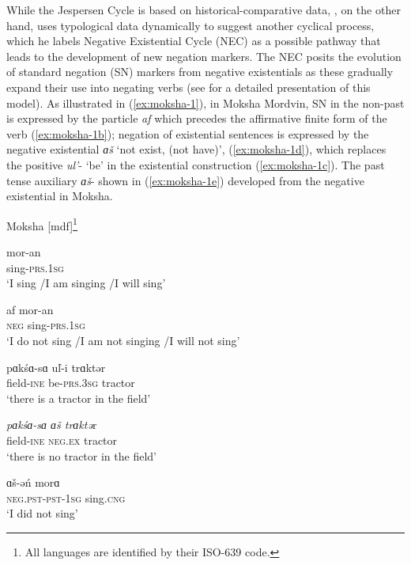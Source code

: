 \documentclass[output=paper,chinesefont,colorlinks,citecolor=brown]{langscibook}
\begin{document}
While the Jespersen Cycle is based on historical-comparative data, \citet{Croft1991}, on the other hand, uses typological data dynamically to suggest another cyclical process, which he labels Negative Existential Cycle (NEC) as a possible pathway that leads to the development of new negation markers. The NEC posits the evolution of standard negation (SN) markers from negative existentials as these gradually expand their use into negating verbs (see  for a detailed presentation of this model). As illustrated in (\ref{ex:moksha-1}), in Moksha Mordvin, SN in the non-past is expressed by the particle \textit{af} which precedes the affirmative finite form of the verb (\ref{ex:moksha-1b}); negation of existential sentences is expressed by the negative existential \textit{ɑš} ‘not exist, (not have)’, (\ref{ex:moksha-1d}), which replaces the positive \textit{ul’}- ‘be’ in the existential construction (\ref{ex:moksha-1c}).  The past tense auxiliary \textit{ɑš}- shown in (\ref{ex:moksha-1e}) developed from the negative existential in Moksha.

\begin{exe} \ex \label{ex:moksha-1} Moksha [mdf]\footnote{All languages are identified by their ISO-639 code.} 
  \begin{xlist}
\ex \label{ex:moksha-1a}
\gll mor-an\\
sing-\textsc{prs.1sg}\\
\glt ‘I sing {\slash}I am singing {\slash}I will sing’

\ex \label{ex:moksha-1b}
\gll af mor-an\\
\textsc{neg} sing-\textsc{prs.1sg}\\
\glt ‘I do not sing {\slash}I am not singing {\slash}I will not sing’

\ex \label{ex:moksha-1c}
\gll pɑkśɑ-sɑ uľ-i trɑktər\\
field-\textsc{ine} be-\textsc{prs.3sg}	tractor\\
\glt ‘there is a tractor in the field’

\ex \label{ex:moksha-1d}
\gll \textit{pɑkśɑ-sɑ ɑš trɑktǝ}r\\
field-\textsc{ine} \textsc{neg.ex} tractor\\
\glt ‘there is no tractor in the field’

\ex \label{ex:moksha-1e}
\gll ɑš-ǝń morɑ\\
\textsc{neg.pst}-\textsc{pst-1sg} sing.\textsc{cng}\\
\glt ‘I did not sing’

  \end{xlist}  
\end{exe}
\end{document}
